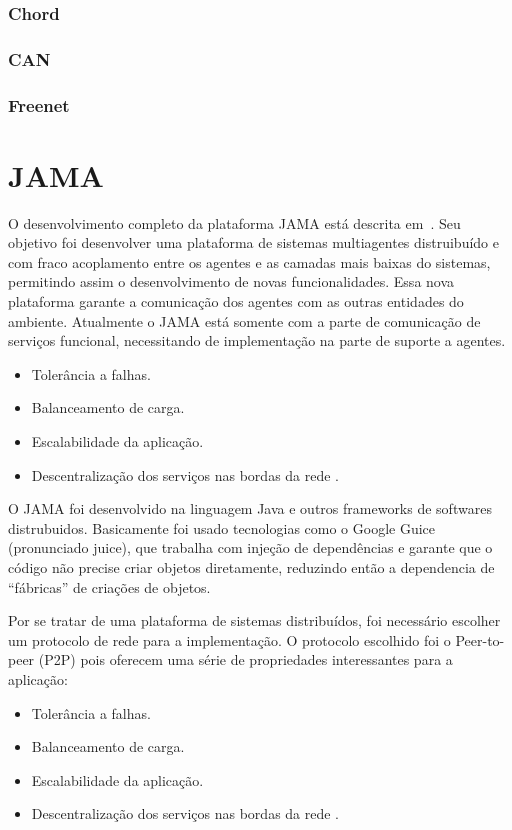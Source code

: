 \subsubsection{Chord}

\subsubsection{CAN}

\subsubsection{Freenet}


\section{JAMA}

O desenvolvimento completo da plataforma JAMA está descrita em~\cite{parise11}. Seu objetivo foi desenvolver uma plataforma de sistemas multiagentes distruibuído e com fraco acoplamento entre os agentes e as camadas mais baixas do sistemas, permitindo assim o desenvolvimento de novas funcionalidades. Essa nova plataforma garante a comunicação dos agentes com as outras entidades do ambiente. Atualmente o JAMA está somente com a parte de comunicação de serviços funcional, necessitando de implementação na parte de suporte a agentes.
\begin{itemize}
	\item Tolerância a falhas.
	\item Balanceamento de carga.
	\item Escalabilidade da aplicação.
	\item Descentralização dos serviços nas bordas da rede	.
\end{itemize}


O JAMA foi desenvolvido na linguagem Java e outros frameworks de softwares distrubuidos. Basicamente foi usado tecnologias como o Google Guice (pronunciado juice), que trabalha com injeção de dependências e garante que o código não precise criar objetos diretamente, reduzindo então a dependencia de ``fábricas'' de criações de objetos.

Por se tratar de uma plataforma de sistemas distribuídos, foi necessário escolher um protocolo de rede para a implementação. O protocolo escolhido foi o Peer-to-peer (P2P) pois oferecem uma série de propriedades interessantes para a aplicação:
\begin{itemize}
	\item Tolerância a falhas.
	\item Balanceamento de carga.
	\item Escalabilidade da aplicação.
	\item Descentralização dos serviços nas bordas da rede	.
\end{itemize}

